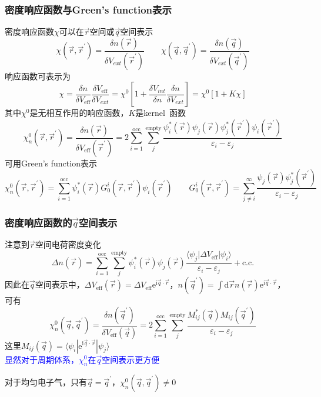 \documentclass[cjk,slidestop,compress,mathserif,blue]{beamer}
\begin{document}
\frame
{
	\frametitle{密度响应函数与\textrm{Green's function}表示}
	密度响应函数$\chi$可以在$\vec r$空间或$\vec q$空间表示
	\begin{displaymath}
		\chi(\vec r,\vec r^{\prime})=\frac{\delta n(\vec r)}{\delta V_{ext}(\vec r^{\prime})}\qquad\chi(\vec q,\vec q^{\prime})=\frac{\delta n(\vec q)}{\delta V_{ext}(\vec q^{\prime})}
	\end{displaymath}
	响应函数可表示为
	\begin{displaymath}
		\chi=\frac{\delta n}{\delta V_{\mathrm{eff}}}\frac{\delta V_{\mathrm{eff}}}{\delta V_{ext}}=\chi^0\left[1+\frac{\delta V_{int}}{\delta n}\frac{\delta n}{\delta V_{ext}}\right]=\chi^0[1+K\chi]
	\end{displaymath}
	其中$\chi^0$是无相互作用的响应函数，$K$是\textrm{kernel~}函数
	\begin{displaymath}
		\chi_n^0(\vec r,\vec r^{\prime})=\frac{\delta n(\vec r)}{\delta V_{\mathrm{eff}}(\vec r^{\prime})}=2\sum_{i=1}^{\mathrm{occ}}\sum_j^{\mathrm{empty}}\frac{\psi_i^{\ast}(\vec r)\psi_j(\vec r)\psi_j^{\ast}(\vec r^{\prime})\psi_i(\vec r^{\prime})}{\varepsilon_i-\varepsilon_j}
	\end{displaymath}
	可用\textrm{Green's function}表示
	\begin{displaymath}
		\chi_n^0(\vec r,\vec r^{\prime})=\sum_{i=1}^{\mathrm{occ}}\psi_i^{\ast}(\vec r)G_0^i(\vec r,\vec r^{\prime})\psi_i(\vec r^{\prime})\qquad G_0^i(\vec r,\vec r^{\prime})=\sum_{j\neq i}^{\infty}\frac{\psi_j(\vec r)\psi_j^{\ast}(\vec r^{\prime})}{\varepsilon_i-\varepsilon_j}
	\end{displaymath}
}

\frame
{
	\frametitle{密度响应函数的$\vec q$空间表示}
	注意到$\vec r$空间电荷密度变化
	\begin{displaymath}
		\Delta n(\vec r)=\sum_{i=1}^{\mathrm{occ}}\sum_j^{\mathrm{empty}}\psi_i^{\ast}(\vec r)\psi_j(\vec r)\frac{\langle\psi_j|\Delta V_{\mathrm{eff}}|\psi_i\rangle}{\varepsilon_i-\varepsilon_j}+\mathrm{c.c.}
	\end{displaymath}
	因此在$\vec q$空间表示中，$\Delta V_{\mathrm{eff}}(\vec r)=\Delta V_{\mathrm{eff}}\mathrm{e}^{\mathrm{i}\vec q\cdot\vec r}$，$n(\vec q^{\prime})=\int\mathrm{d}\vec rn(\vec r)\mathrm{e}^{\mathrm{i}\vec q\cdot\vec r}$，\\可有
	\begin{displaymath}
		\chi_n^0(\vec q,\vec q^{\prime})=\frac{\delta n(\vec q^{\prime})}{\delta V_{\mathrm{eff}}(\vec q)}=2\sum_{i=1}^{\mathrm{occ}}\sum_j^{\mathrm{empty}}\frac{M_{ij}^{\ast}(\vec q)M_{ij}(\vec q^{\prime})}{\varepsilon_i-\varepsilon_j}
	\end{displaymath}
	这里$M_{ij}(\vec q)=\langle\psi_i|\mathrm{e}^{\mathrm{i}\vec q\cdot\vec r}|\psi_j\rangle$\\
	\vspace{10pt}
	\textcolor{blue}{显然对于周期体系，$\chi_n^0$在$\vec q$空间表示更方便}
	
	对于均匀电子气，只有$\vec q=\vec q^{\prime}$，$\chi_n^0(\vec q,\vec q^{\prime})\neq0$
}
\end{document}
